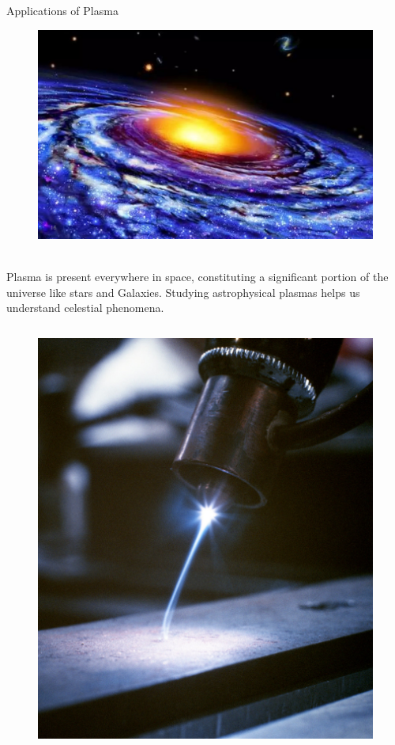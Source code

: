 \documentclass[13pt]{beamer}
\begin{document}
\begin{frame}[t,allowframebreaks]{Applications of Plasma}
\begin{figure}
			\includegraphics[height=0.3 \textwidth]{Images/apps (2).jpg}
		\end{figure}
		\\
		  Plasma is present everywhere in space, constituting a significant portion of the universe like stars and Galaxies.
		Studying astrophysical plasmas helps us understand celestial phenomena.








		 \begin{columns}


\begin{figure}
	\centering
	\includegraphics[width = \textwidth]{Images/application.jpg}
\end{figure}


\end{columns}
\end{frame}
\end{document}

